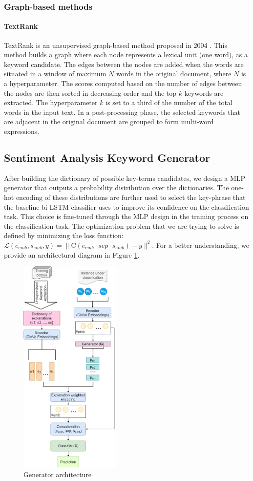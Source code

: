 \subsubsection{Graph-based methods}
\paragraph{TextRank}
TextRank is an unsupervised graph-based method proposed in 2004 \cite{TextRank}. This method builds a graph where each node represents a lexical unit (one word), as a keyword candidate. The edges between the nodes are added when the words are situated in a window of maximum $N$ words in the original document, where $N$ is a hyperparameter. The scores computed based on the number of edges between the nodes are then sorted in decreasing order and the top $k$ keywords are extracted. The hyperparameter $k$ is set to a third of the number of the total words in the input text. In a post-processing phase, the selected keywords that are adjacent in the original document are grouped to form multi-word expressions.

\subsection{Sentiment Analysis Keyword Generator}\label{generator}
After building the dictionary of possible key-terms candidates, we design a MLP generator that outputs a probability distribution over the dictionaries. The one-hot encoding of these distributions are further used to select the key-phrase that the baseline bi-LSTM classifier uses to improve its confidence on the classification task. This choice is fine-tuned through the MLP design in the training process on the classification task.
The optimization problem that we are trying to solve is defined by minimizing the loss function:
$\label{eqloss}
    \mathcal{L}(e_{emb}, s_{emb},y)= \|\text{C}(e_{emb}\cdot sep \cdot s_{emb})-y\| ^2
$.
For a better understanding, we provide an architectural diagram in Figure \ref{fig:gen}.


\begin{figure}[!h]
\centering
  \includegraphics[width=5cm]{Images/gen.png}
  \caption{Generator architecture}\label{fig:gen}
\end{figure}